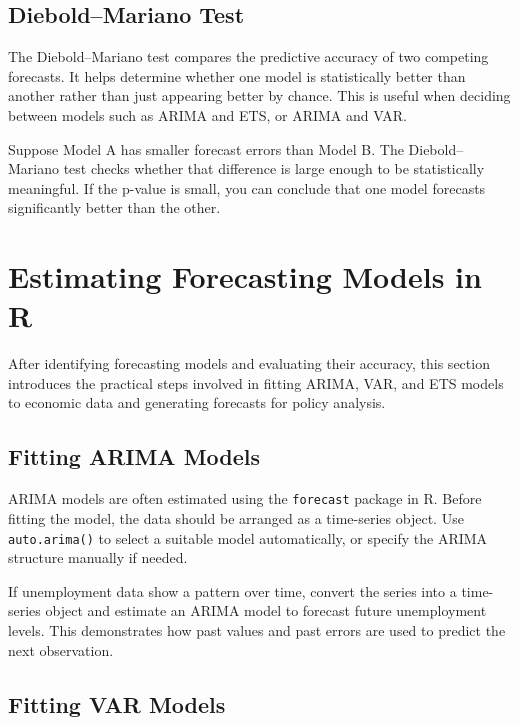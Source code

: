 \documentclass[12pt,a4paper]{article}
\begin{document}
\subsection{Diebold--Mariano Test}

The Diebold--Mariano test compares the predictive accuracy of two competing forecasts. It helps determine whether one model is statistically better than another rather than just appearing better by chance. This is useful when deciding between models such as ARIMA and ETS, or ARIMA and VAR.

\begin{example}
Suppose Model A has smaller forecast errors than Model B. The Diebold--Mariano test checks whether that difference is large enough to be statistically meaningful. If the p-value is small, you can conclude that one model forecasts significantly better than the other.
\end{example}

\section{Estimating Forecasting Models in R}

After identifying forecasting models and evaluating their accuracy, this section introduces the practical steps involved in fitting ARIMA, VAR, and ETS models to economic data and generating forecasts for policy analysis.

\subsection{Fitting ARIMA Models}

ARIMA models are often estimated using the \texttt{forecast} package in R. Before fitting the model, the data should be arranged as a time-series object. Use \texttt{auto.arima()} to select a suitable model automatically, or specify the ARIMA structure manually if needed.

\begin{example}
If unemployment data show a pattern over time, convert the series into a time-series object and estimate an ARIMA model to forecast future unemployment levels. This demonstrates how past values and past errors are used to predict the next observation.
\end{example}

\subsection{Fitting VAR Models}
\end{document}
